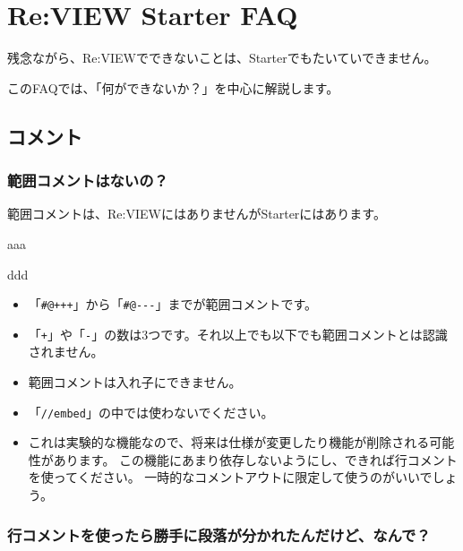 \chapter{Re:VIEW Starter FAQ}
\label{chap:chap02-faq}
\begin{starterabstract}
残念ながら、Re:VIEWでできないことは、Starterでもたいていできません。

このFAQでは、「何ができないか？」を中心に解説します。
\end{starterabstract}

\section{コメント}
\label{sec:2-1}

\subsection{範囲コメントはないの？}
\label{sec:2-1-1}

範囲コメントは、Re:VIEWにはありませんがStarterにはあります。

\begin{starterprogram}\end{starterprogram}
\noindent
{}

\starterresult

aaa

ddd

\endstarterresult

\begin{itemize}
\item 「\texttt{\#@+++}」から「\texttt{\#@{-}{-}{-}}」までが範囲コメントです。
\item 「\texttt{+}」や「\texttt{{-}}」の数は3つです。それ以上でも以下でも範囲コメントとは認識されません。
\item 範囲コメントは入れ子にできません。
\item 「\texttt{//embed}」の中では使わないでください。
\item これは実験的な機能なので、将来は仕様が変更したり機能が削除される可能性があります。
   この機能にあまり依存しないようにし、できれば行コメントを使ってください。
   一時的なコメントアウトに限定して使うのがいいでしょう。
\end{itemize}

\subsection{行コメントを使ったら勝手に段落が分かれたんだけど、なんで？}
\label{sec:2-1-2}

